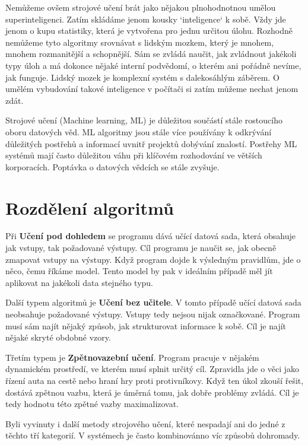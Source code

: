 \documentclass[a4paper,11pt, oneside]{book} \usepackage[czech]{babel}
\begin{document}
	Nemůžeme ovšem strojové učení brát jako nějakou plnohodnotnou umělou superinteligenci.
	Zatím skládáme jenom kousky `inteligence` k sobě.
	Vždy jde jenom o kupu statistiky, která je vytvořena pro jednu určitou úlohu.
	Rozhodně nemůžeme tyto algoritmy srovnávat s lidským mozkem, který je mnohem,
	mnohem rozmanitější a schopnější. Sám se zvládá naučit,
	jak zvládnout jakékoli typy úloh a má dokonce
	nějaké interní podvědomí, o kterém ani pořádně nevíme, jak funguje. Lidský mozek je
	komplexní systém s dalekosáhlým záběrem. O umělém vybudování takové inteligence
	v počítači si zatím můžeme nechat jenom zdát.

	Strojové učení (Machine learning, ML) je důležitou součástí stále rostoucího oboru datových věd.
	ML algoritmy jsou stále více používány k odkrývání důležitých postřehů a informací uvnitř
	projektů dobývání znalostí. Postřehy ML systémů mají často důležitou váhu při klíčovém
	rozhodování ve větších korporacích. Poptávka o datových vědcích se stále zvyšuje.


	\section{Rozdělení algoritmů}

	Při \textbf{Učení pod dohledem}
	se programu dává učící datová sada, která obsahuje jak vstupy, tak požadované
	výstupy. Cíl programu je naučit se, jak obecně zmapovat vstupy na výstupy.
	Když program dojde k výsledným pravidlům, jde o něco, čemu říkáme model.
	Tento model by pak v ideálním případě měl jít aplikovat na jakékoli data stejného typu.


	Další typem algoritmů je \textbf{Učení bez učitele}. V tomto případě učící datová sada
	neobsahuje požadované výstupy. Vstupy tedy nejsou nijak označkované.
	Program musí sám najít nějaký způsob, jak strukturovat informace k sobě. Cíl
	je najít nějaké skryté obdobné vzory.

	Třetím typem je \textbf{Zpětnovazební učení}.
	Program pracuje v nějakém dynamickém prostředí, ve kterém musí splnit určitý
	cíl. Zpravidla jde o věci jako řízení auta na cestě nebo hraní hry proti
	protivníkovy.  Když ten úkol zkouší řešit, dostává zpětnou vazbu, která je
	úměrná tomu, jak dobře problémy zvládá. Cíl je tedy hodnotu této zpětné vazby
	maximalizovat.

	Byli vyvinuty i další metody strojového učení, které nespadají ani do jedné z
	těchto tří kategorií. V systémech je často kombinovánno víc způsobů dohromady.
\end{document}
